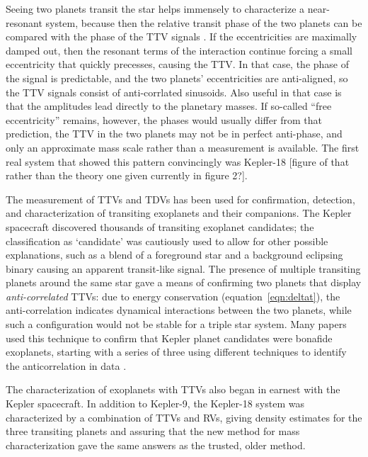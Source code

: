 \documentclass[graybox,natbib,nosecnum]{svmult}
\begin{document}
Seeing two planets transit the star helps immensely to characterize a near-resonant system, because then the relative transit phase of the two planets can be compared with the phase of the TTV signals \citep{2012ApJ...761..122L}.  If the eccentricities are maximally damped out, then the resonant terms of the interaction continue forcing a small eccentricity that quickly precesses, causing the TTV.  In that case, the phase of the signal is predictable, and the two planets' eccentricities are anti-aligned, so the TTV signals consist of anti-corrlated sinusoids.  Also useful in that case is that the amplitudes lead directly to the planetary masses.  If so-called ``free eccentricity'' remains, however, the phases would usually differ from that prediction, the TTV in the two planets may not be in perfect anti-phase, and only an approximate mass scale rather than a measurement is available.  The first real system that showed this pattern convincingly was Kepler-18 \citep{2011ApJS..197....7C} [figure of that rather than the theory one given currently in figure 2?]. 

The measurement of TTVs and TDVs has been used for confirmation, detection, and characterization of
transiting exoplanets and their companions.  The Kepler spacecraft discovered thousands of transiting
exoplanet candidates;  the classification as `candidate' was cautiously used to allow for other
possible explanations, such as a blend of a foreground star and a background eclipsing binary causing
an apparent transit-like signal.  The presence of multiple transiting planets around the same star
gave a means of confirming two planets that display {\em anti-correlated} TTVs: due to energy conservation (equation~\ref{eqn:deltat}), the anti-correlation indicates dynamical interactions between the
two planets, while such a configuration would not be stable for a triple star system.  Many papers 
used this technique to confirm that Kepler planet candidates were bonafide exoplanets, starting with a series of three using different techniques to identify the anticorrelation in data \citet{2011ApJS..197....2F, 2012ApJ...750..113F, 2012ApJ...750..114F}.

The characterization of exoplanets with TTVs also began in earnest with the Kepler spacecraft.
In addition to Kepler-9, the Kepler-18 system was characterized by a combination of TTVs and
RVs, giving density estimates for the three transiting planets \citep{2011ApJS..197....7C} and assuring that the new method for mass characterization gave the same answers as the trusted, older method.
\end{document}
